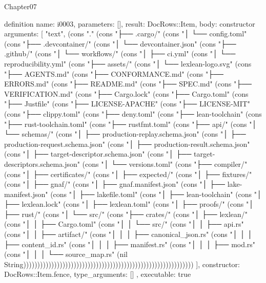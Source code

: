 \begin{lexlean}{Chapter07}
\begin{semanticmodule}
definition{
  name: i0003,
  parameters: [],
  result: DocRows::Item,
  body: constructor{
    arguments: [
      "text",
      (cons "." (cons "├── .cargo/" (cons "│   └── config.toml" (cons "├── .devcontainer/" (cons "│   └── devcontainer.json" (cons "├── .github/" (cons "│   └── workflows/" (cons "│       ├── ci.yml" (cons "│       └── reproducibility.yml" (cons "├── assets/" (cons "│   └── lexlean-logo.svg" (cons "├── AGENTS.md" (cons "├── CONFORMANCE.md" (cons "├── ERRORS.md" (cons "├── README.md" (cons "├── SPEC.md" (cons "├── VERIFICATION.md" (cons "├── Cargo.lock" (cons "├── Cargo.toml" (cons "├── Justfile" (cons "├── LICENSE-APACHE" (cons "├── LICENSE-MIT" (cons "├── clippy.toml" (cons "├── deny.toml" (cons "├── lean-toolchain" (cons "├── rust-toolchain.toml" (cons "├── rustfmt.toml" (cons "├── api/" (cons "│   └── schemas/" (cons "│       ├── production-replay.schema.json" (cons "│       ├── production-request.schema.json" (cons "│       ├── production-result.schema.json" (cons "│       ├── target-descriptor.schema.json" (cons "│       ├── target-descriptors.schema.json" (cons "│       └── versions.toml" (cons "├── compiler/" (cons "│   ├── certificates/" (cons "│   ├── expected/" (cons "│   ├── fixtures/" (cons "│   ├── gnaf/" (cons "│   ├── gnaf.manifest.json" (cons "│   ├── lake-manifest.json" (cons "│   ├── lakefile.toml" (cons "│   ├── lean-toolchain" (cons "│   ├── lexlean.lock" (cons "│   ├── lexlean.toml" (cons "│   ├── proofs/" (cons "│   ├── rust/" (cons "│   └── src/" (cons "├── crates/" (cons "│   ├── lexlean/" (cons "│   │   ├── Cargo.toml" (cons "│   │   └── src/" (cons "│   │       ├── api.rs" (cons "│   │       ├── artifact/" (cons "│   │       │   ├── canonical_json.rs" (cons "│   │       │   ├── content_id.rs" (cons "│   │       │   ├── manifest.rs" (cons "│   │       │   ├── mod.rs" (cons "│   │       │   └── source_map.rs" (nil String)))))))))))))))))))))))))))))))))))))))))))))))))))))))))))))
    ],
    constructor: DocRows::Item.fence,
    type_arguments: []
  },
  executable: true
}


\end{semanticmodule}
\end{lexlean}
